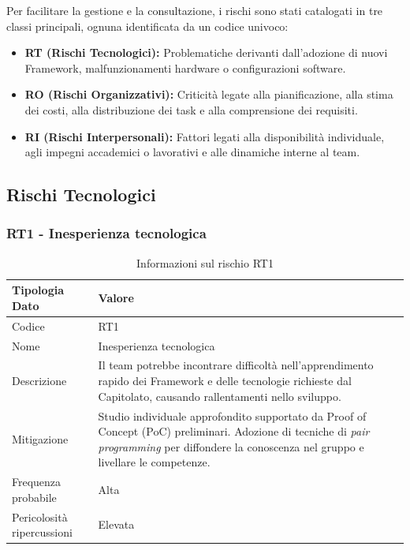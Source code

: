 \documentclass[a4paper,12pt]{article}
\begin{document}
Per facilitare la gestione e la consultazione, i rischi sono stati catalogati in tre classi principali, ognuna identificata da un codice univoco:
\begin{itemize}
    \item \textbf{RT (Rischi Tecnologici):} Problematiche derivanti dall'adozione di nuovi Framework, malfunzionamenti hardware o configurazioni software.
    \item \textbf{RO (Rischi Organizzativi):} Criticità legate alla pianificazione, alla stima dei costi, alla distribuzione dei task e alla comprensione dei requisiti.
    \item \textbf{RI (Rischi Interpersonali):} Fattori legati alla disponibilità individuale, agli impegni accademici o lavorativi e alle dinamiche interne al team.
\end{itemize}

\clearpage
\subsection{Rischi Tecnologici} \label{sec:rischi_tecnologici}

\subsubsection{RT1 - Inesperienza tecnologica}
\begin{table}[H]
    \centering
    \renewcommand{\arraystretch}{1.4}
    \begin{tabularx}{\textwidth}{|L|Z|}
        \hline
        \textbf{Tipologia Dato} & \textbf{Valore} \\
        \hline
        Codice & RT1 \\
        \hline
        Nome & Inesperienza tecnologica \\
        \hline
        Descrizione & Il team potrebbe incontrare difficoltà nell'apprendimento rapido dei Framework e delle tecnologie richieste dal Capitolato, causando rallentamenti nello sviluppo. \\
        \hline
        Mitigazione & Studio individuale approfondito supportato da Proof of Concept (PoC) preliminari. Adozione di tecniche di \textit{pair programming} per diffondere la conoscenza nel gruppo e livellare le competenze. \\
        \hline
        Frequenza probabile & Alta \\
        \hline
        Pericolosità ripercussioni & Elevata \\
        \hline
    \end{tabularx}
    \caption{Informazioni sul rischio RT1}
    \label{tab:RT1}
\end{table}
\end{document}
